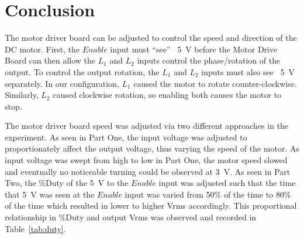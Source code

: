 \section{Conclusion}
\label{sec:conclusion}

The motor driver board can be adjusted to control the speed and direction of the DC motor.  First, the $Enable$ input must ``see'' ~\SI{5}{V} before the Motor Drive Board can then allow the $L_1$ and $L_2$ inputs control the phase/rotation of the output.  To control the output rotation, the $L_1$ and $L_2$ inputs must also see ~\SI{5}{V} separately.  In our configuration, $L_1$ caused the motor to rotate counter-clockwise.  Similarly, $L_2$ caused clockwise rotation, so enabling both causes the motor to stop.

The motor driver board speed was adjusted via two different approaches in the experiment.  As seen in Part One, the input voltage was adjusted to proportionately affect the output voltage, thus varying the speed of the motor.  As input voltage was swept from high to low in Part One, the motor speed slowed and eventually no noticeable turning could be observed at \SI{3}{V}.  As seen in Part Two, the \%Duty of the \SI{5}{V} to the $Enable$ input was adjusted such that the time that \SI{5}{V} was seen at the $Enable$ input was varied from 50\% of the time to 80\% of the time which resulted in lower to higher Vrms accordingly.  This proportional relationship in \%Duty and output Vrms was observed and recorded in Table~\ref{tab:duty}.




